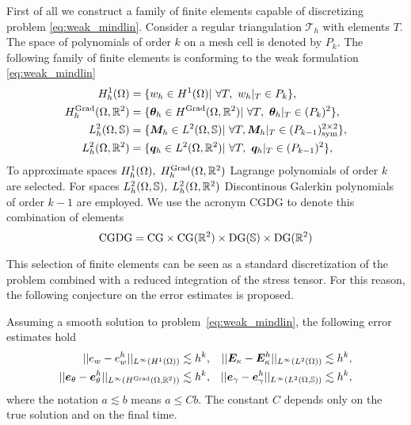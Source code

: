First of all we construct a family of finite elements capable of discretizing problem \eqref{eq:weak_mindlin}. Consider a regular triangulation $\mathcal{T}_h$ with elements $T$. The space of polynomials of order $k$ on a mesh cell is denoted by $P_k$. The following family of finite elements is conforming to the weak formulation \eqref{eq:weak_mindlin}
\begin{equation}\label{eq:CGDG}
\begin{aligned}
H_{h}^{1}(\Omega) &= \{w_h \in H^1(\Omega) \vert \ \forall T, \ w_h|_{T} \in P_{k} \}, \\
H_h^{\Grad}(\Omega, \bbR^2) &= \{ \bm{\theta}_h \in H^{\Grad}(\Omega, \bbR^2) \vert \ \forall T,\ \bm{\theta}_h|_{T} \in (P_{k})^2 \}, \\
L_h^2(\Omega, \mathbb{S}) &= \{ \bm{M}_h \in L^2(\Omega, \mathbb{S}) \vert \ \forall T, \bm{M}_h|_{T} \in (P_{k-1})^{2 \times 2}_{\text{sym}} \}, \\
L_h^2(\Omega, \bbR^2) &= \{\bm{q}_h \in L^2(\Omega, \bbR^2)  \vert \ \forall T,\ \bm{q}_h|_{T} \in (P_{k-1})^{2} \}, \\
\end{aligned}
\end{equation}
To approximate spaces $H_h^{1}(\Omega), \; H_h^{\operatorname*{Grad}}(\Omega, \mathbb{R}^2)$ Lagrange polynomials of order $k$ are selected. For spaces $L_h^2(\Omega, \mathbb{S}), \; L_h^2(\Omega, \mathbb{R}^2)$ Discontinous Galerkin polynomials of order $k-1$ are employed. We use the acronym CGDG to denote this combination of elements
\[
\mathrm{CGDG} = \mathrm{CG} \times \mathrm{CG}(\mathbb{R}^2) \times \mathrm{DG}(\mathbb{S}) \times \mathrm{DG}(\mathbb{R}^2)
\]

This selection of finite elements can be seen as a standard discretization of the problem combined with a reduced integration of the stress tensor. For this reason, the following conjecture on the error estimates is proposed. 

\begin{conjecture}\label{conj:min}\label{conj:CGDGestimates}
	Assuming a smooth solution to problem~\eqref{eq:weak_mindlin}, the following error estimates hold 
	\begin{equation}
	\label{eq:errCGDG}
	\begin{aligned}
	||e_w - e_w^h||_{L^{\infty}(H^1(\Omega))} &\lesssim h^{k}, \\
	||\bm{e}_\theta - \bm{e}_\theta^h||_{L^{\infty}(H^{\operatorname*{Grad}}(\Omega, \mathbb{R}^2))} &\lesssim h^{k}, \\
	\end{aligned} \quad
	\begin{aligned}
	||\bm{E}_\kappa - \bm{E}_\kappa^h||_{L^{\infty}(L^2(\Omega))} &\lesssim  h^{k}, \\
	||\bm{e}_\gamma - \bm{e}_\gamma^ h||_{L^{\infty}(L^2(\Omega, \mathbb{S}))} &\lesssim  h^{k}, \\
	\end{aligned} 
	\end{equation}
	where the notation $a \lesssim  b$ means $a \le C b$. The constant $C$ depends only on the true solution and on the final time.
\end{conjecture}


